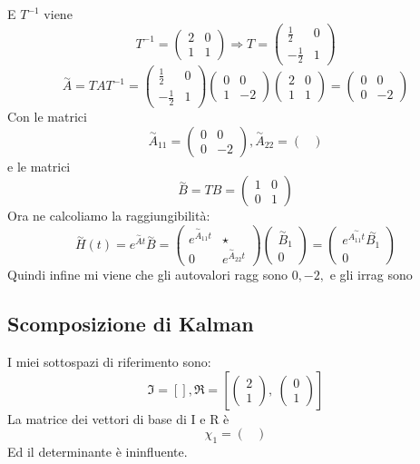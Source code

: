 \documentclass{article}
\begin{document}
E $T^{-1}$ viene \[ T^{-1} = \left(\begin{matrix}2 & 0\\1 & 1\end{matrix}\right) \Longrightarrow T = \left(\begin{matrix}\frac{1}{2} & 0\\- \frac{1}{2} & 1\end{matrix}\right) \]
\[ \overset{\sim}{A} = T A  T^{-1} = \left(\begin{matrix}\frac{1}{2} & 0\\- \frac{1}{2} & 1\end{matrix}\right)\left(\begin{matrix}0 & 0\\1 & -2\end{matrix}\right)\left(\begin{matrix}2 & 0\\1 & 1\end{matrix}\right) = \left(\begin{matrix}0 & 0\\0 & -2\end{matrix}\right) \]Con le matrici \[ \overset{\sim}{A}_{11} = \left(\begin{matrix}0 & 0\\0 & -2\end{matrix}\right) , \overset{\sim}{A}_{22} = \left(\begin{matrix}\end{matrix}\right)  \]e le matrici \[ \overset{\sim}{B} = TB = \left(\begin{matrix}1 & 0\\0 & 1\end{matrix}\right)  \]
Ora ne calcoliamo la raggiungibilità: \[ \overset{\sim}{H}(t) = e^{\overset{\sim}{A}t}\overset{\sim}{B} = \begin{pmatrix} e^{\overset{\sim}{A}_{11}t} &  \star \\ 0 & e^{\overset{\sim}{A}_{22}t} \end{pmatrix} \begin{pmatrix} \overset{\sim}{B}_1 \\ 0 \end{pmatrix} = \begin{pmatrix} e^{\overset{\sim}{A_{11}t}}\overset{\sim}{B_1} \\ 0 \end{pmatrix} \]
Quindi infine mi viene che gli autovalori ragg sono $ 0, -2,  $ e gli irrag sono $  $
\subsection{Scomposizione di Kalman}
I miei sottospazi di riferimento sono:	\[ \mathfrak{I} = \left[ \right], \mathfrak{R} = \left[ \left(\begin{matrix}2\\1\end{matrix}\right), \  \left(\begin{matrix}0\\1\end{matrix}\right)\right] \]
La matrice dei vettori di base di I e R è \[ \chi_1 =  \left(\begin{matrix}\end{matrix}\right) \]Ed il determinante è ininfluente.
\end{document}
